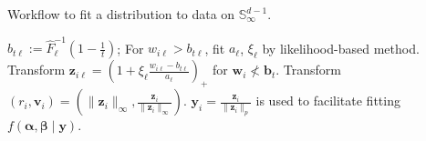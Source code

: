%     
\begin{algorithm}[tb]
    \caption{Workflow to fit a distribution to data 
        on $\mathbb{S}_{\infty}^{d-1}$.}\label{alg:workflow}
    \begin{algorithmic}[1]
        \State $b_{t\ell} := \hat{F}_{\ell}^{-1}\left(1 - \frac{1}{t}\right)$; 
            For $w_{i\ell} > b_{t\ell}$, fit $a_{\ell}$, $\xi_{\ell}$ 
            by likelihood-based method.
        \State Transform 
            $\bm{z}_{i\ell} = \left(1 + \xi_{\ell}\frac{w_{i\ell} 
                - b_{t\ell}}{a_{\ell}}\right)_+$ for $\bm{w}_i\not< \bm{b}_t$.
        \State Transform $(r_i,\bm{v}_i) = \left(\lVert \bm{z}_i\rVert_\infty, 
            \frac{\bm{z}_i}{\lVert \bm{z}_i\rVert_{\infty}}\right)$.
        \State $\bm{y}_i = \frac{\bm{z}_i}{\lVert \bm{z}_i\rVert_p}$ is used to facilitate fitting $f(\bm{\alpha}, \bm{\beta}\mid\bm{y})$.
    \end{algorithmic}
\end{algorithm}

